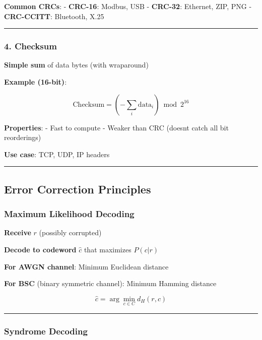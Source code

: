 \textbf{Common CRCs}: - \textbf{CRC-16}: Modbus, USB - \textbf{CRC-32}:
Ethernet, ZIP, PNG - \textbf{CRC-CCITT}: Bluetooth, X.25

\begin{center}\rule{0.5\linewidth}{0.5pt}\end{center}

\subsubsection{4. Checksum}\label{checksum}

\textbf{Simple sum} of data bytes (with wraparound)

\textbf{Example (16-bit)}:

\[
\text{Checksum} = \left(-\sum_{i} \text{data}_i\right) \bmod 2^{16}
\]

\textbf{Properties}: - Fast to compute - Weaker than CRC
(doesn\textquotesingle t catch all bit reorderings)

\textbf{Use case}: TCP, UDP, IP headers

\begin{center}\rule{0.5\linewidth}{0.5pt}\end{center}

\subsection{Error Correction
Principles}\label{error-correction-principles}

\subsubsection{Maximum Likelihood
Decoding}\label{maximum-likelihood-decoding}

\textbf{Receive} \(r\) (possibly corrupted)

\textbf{Decode to codeword} \(\hat{c}\) that maximizes \(P(c | r)\)

\textbf{For AWGN channel}: Minimum Euclidean distance

\textbf{For BSC} (binary symmetric channel): Minimum Hamming distance

\[
\hat{c} = \arg\min_{c \in C} d_H(r, c)
\]

\begin{center}\rule{0.5\linewidth}{0.5pt}\end{center}

\subsubsection{Syndrome Decoding}\label{syndrome-decoding}

